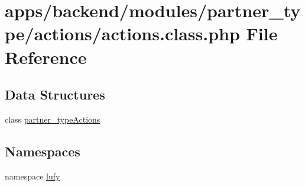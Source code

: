 \hypertarget{backend_2modules_2partner__type_2actions_2actions_8class_8php}{\section{apps/backend/modules/partner\-\_\-type/actions/actions.class.\-php File Reference}
\label{backend_2modules_2partner__type_2actions_2actions_8class_8php}
}
\subsection*{Data Structures}
\begin{DoxyCompactItemize}
\item 
class \hyperlink{classpartner__type_actions}{partner\-\_\-type\-Actions}
\end{DoxyCompactItemize}
\subsection*{Namespaces}
\begin{DoxyCompactItemize}
\item 
namespace \hyperlink{namespacelufy}{lufy}
\end{DoxyCompactItemize}
